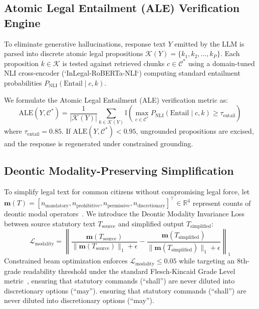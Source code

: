\documentclass[conference]{IEEEtran}
\begin{document}
\subsection{Atomic Legal Entailment (ALE) Verification Engine}
To eliminate generative hallucinations, response text $Y$ emitted by the LLM is parsed into discrete atomic legal propositions $\mathcal{K}(Y) = \{k_1, k_2, \dots, k_P\}$. Each proposition $k \in \mathcal{K}$ is tested against retrieved chunks $c \in \mathcal{C}^*$ using a domain-tuned NLI cross-encoder (`InLegal-RoBERTa-NLI`) computing standard entailment probabilities $P_{\text{NLI}}(\text{Entail} \mid c, k)$.

We formulate the Atomic Legal Entailment (ALE) verification metric as:
\begin{equation}
\text{ALE}(Y, \mathcal{C}^*) = \frac{1}{|\mathcal{K}(Y)|} \sum_{k \in \mathcal{K}(Y)} \mathbb{I}\left( \max_{c \in \mathcal{C}^*} P_{\text{NLI}}(\text{Entail} \mid c, k) \ge \tau_{\text{entail}} \right)
\end{equation}
where $\tau_{\text{entail}} = 0.85$. If $\text{ALE}(Y, \mathcal{C}^*) < 0.95$, ungrounded propositions are excised, and the response is regenerated under constrained grounding.

\subsection{Deontic Modality-Preserving Simplification}
To simplify legal text for common citizens without compromising legal force, let $\mathbf{m}(T) = [n_{\text{mandatory}}, n_{\text{prohibitive}}, n_{\text{permissive}}, n_{\text{discretionary}}]^\top \in \mathbb{R}^4$ represent counts of deontic modal operators~\cite{von1951deontic}. We introduce the Deontic Modality Invariance Loss between source statutory text $T_{\text{source}}$ and simplified output $T_{\text{simplified}}$:
\begin{equation}
\mathcal{L}_{\text{modality}} = \left\| \frac{\mathbf{m}(T_{\text{source}})}{\|\mathbf{m}(T_{\text{source}})\|_1 + \epsilon} - \frac{\mathbf{m}(T_{\text{simplified}})}{\|\mathbf{m}(T_{\text{simplified}})\|_1 + \epsilon} \right\|_1
\end{equation}
Constrained beam optimization enforces $\mathcal{L}_{\text{modality}} \le 0.05$ while targeting an 8th-grade readability threshold under the standard Flesch-Kincaid Grade Level metric~\cite{kincaid1975derivation}, ensuring that statutory commands (``shall'') are never diluted into discretionary options (``may'').
ensuring that statutory commands (``shall'') are never diluted into discretionary options (``may'').
\end{document}
